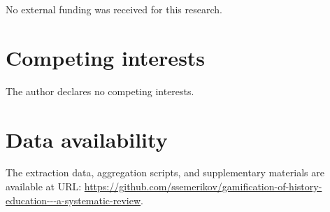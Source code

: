 \documentclass[a4paper,fleqn]{cas-sc}
\begin{document}
No external funding was received for this research.

\section*{Competing interests}

The author declares no competing interests.

\section*{Data availability}

The extraction data, aggregation scripts, and supplementary materials are available at URL: \url{https://github.com/ssemerikov/gamification-of-history-education---a-systematic-review}.
\end{document}
